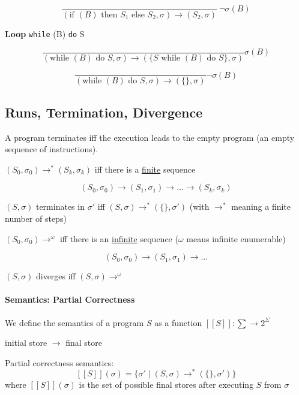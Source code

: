 \documentclass[12pt, a4paper]{book}
\begin{document}
$$
\frac{}
{(\textrm{if } (B) \textrm{ then } S_{1} \textrm{ else } S_{2}, \sigma) \longrightarrow (S_{2}, \sigma)}
\ \lnot\sigma(B)
$$

\noindent \textbf{Loop} \verb#while# (B) \verb#do# S

$$
\frac{}
{(\textrm{while } (B) \textrm{ do } S, \sigma) \longrightarrow (\{ S \textrm{ while } (B) \textrm{ do } S\}, \sigma)}
\sigma(B)
$$

$$
\frac{}
{(\textrm{while } (B) \textrm{ do } S, \sigma) \longrightarrow (\{ \}, \sigma)}
\lnot\sigma(B)
$$

\subsection{Runs, Termination, Divergence}

A program terminates iff the execution leads to the empty program (an empty
sequence of instructions). \newline

$(S_{0}, \sigma_{0}) \longrightarrow^{*} (S_{k}, \sigma_{k})$ iff there is a
\underline{finite} sequence

$$
(S_{0}, \sigma_{0}) \longrightarrow (S_{1}, \sigma_{1}) \longrightarrow \ldots
\longrightarrow (S_{k}, \sigma_{k})
$$

$(S, \sigma)$ terminates in $\sigma'$ iff $(S, \sigma) \longrightarrow^{*} (\{\}, \sigma')$ (with $\longrightarrow^{*}$ meaning a finite number of steps)

$(S_{0}, \sigma_{0}) \longrightarrow^{\omega}$ iff there is an \underline{infinite} sequence ($\omega$ means infinite enumerable)

$$
(S_{0}, \sigma_{0}) \longrightarrow (S_{1}, \sigma_{1}) \longrightarrow \ldots
$$

$(S,\sigma)$ diverges iff $(S,\sigma) \longrightarrow^{\omega}$

\paragraph{Semantics: Partial Correctness}

We define the semantics of a program $S$ as a function $[[S]]: \sum \rightarrow 2^{\Sigma}$ \newline

initial store $\rightarrow$ final store \newline

Partial correctness semantics:
$$
[[S]](\sigma) = \{\sigma' \mid (S,\sigma) \longrightarrow^{*} (\{\}, \sigma')\}
$$
where $[[S]](\sigma)$ is the set of possible final stores after executing $S$
from $\sigma$
\end{document}
